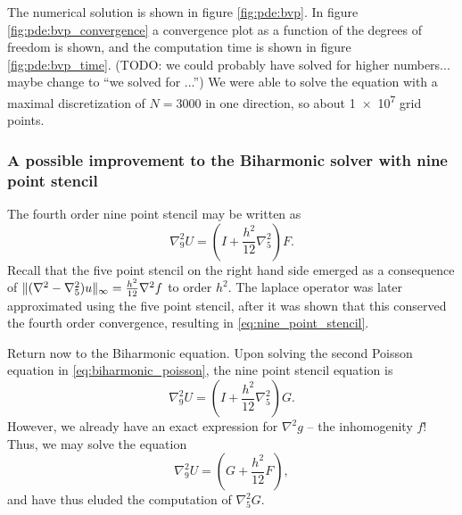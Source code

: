 The numerical solution is shown in figure \ref{fig:pde:bvp}.
In figure \ref{fig:pde:bvp_convergence} a convergence plot as a function of the degrees of freedom is shown, and the computation time is shown in figure \ref{fig:pde:bvp_time}.
(TODO: we could probably have solved for higher numbers... maybe change to ``we solved for ...'')
We were able to solve the equation with a maximal discretization of $N = 3000$ in one direction, so about \num{1e7} grid points.

\subsubsection{A possible improvement to the Biharmonic solver with nine point stencil}
The fourth order nine point stencil may be written as
\begin{equation}\label{eq:nine_point_stencil}
  \nabla_9^2 U
  = \left(I + \frac{h^2}{12} \nabla_5^2\right) F.
\end{equation}
Recall that the five point stencil on the right hand side emerged as a consequence of
$\lVert (\nabla^2 - \nabla_5^2)u \rVert_\infty = \frac{h^2}{12}\nabla^2 f$
to order $h^2$.
The laplace operator was later approximated using the five point stencil, after it was shown that this conserved the fourth order convergence, resulting in \eqref{eq:nine_point_stencil}.

Return now to the Biharmonic equation.
Upon solving the second Poisson equation in \eqref{eq:biharmonic_poisson}, the nine point stencil equation is
\begin{equation}
    \nabla_9^2 U
    = \left(I + \frac{h^2}{12} \nabla_5^2\right) G.
\end{equation}
However, we already have an exact expression for $\nabla^2 g$ -- the inhomogenity $f$!
Thus, we may solve the equation 
\begin{equation}
    \nabla_9^2 U
    = \left(G + \frac{h^2}{12} F\right),
\end{equation}
and have thus eluded the computation of $\nabla_5^2 G$.




